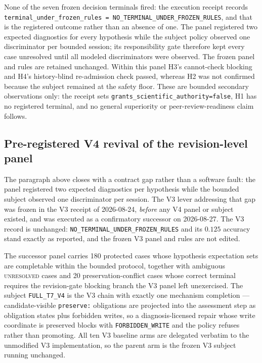 None of the seven frozen decision terminals fired: the execution receipt
records \texttt{terminal\_under\_frozen\_rules =
NO\_TERMINAL\_UNDER\_FROZEN\_RULES}, and that is the registered outcome rather
than an absence of one. The panel registered two
expected diagnostics for every hypothesis while the subject policy observed
one discriminator per bounded session; its responsibility gate therefore kept
every case unresolved until all modeled discriminators were observed. The
frozen panel and rules are retained unchanged. Within this panel H3's
cannot-check blocking and H4's history-blind re-admission check passed, whereas
H2 was not confirmed because the subject remained at the safety floor. These
are bounded secondary observations only: the receipt sets
\texttt{grants\_scientific\_authority=false}, H1 has no registered terminal,
and no general superiority or peer-review-readiness claim follows.

\subsection*{Pre-registered V4 revival of the revision-level panel}

The paragraph above closes with a contract gap rather than a software fault: the
panel registered two expected diagnostics per hypothesis while the bounded
subject observed one discriminator per session. The V3 lever addressing that gap
was frozen in the V3 receipt of 2026-08-24, \emph{before} any V4 panel or subject
existed, and was executed as a confirmatory successor on 2026-08-27. The V3
record is unchanged: \texttt{NO\_TERMINAL\_UNDER\_FROZEN\_RULES} and its $0.125$
accuracy stand exactly as reported, and the frozen V3 panel and rules are not
edited.

The successor panel carries 180 protected cases whose hypothesis expectation sets
are completable within the bounded protocol, together with ambiguous
\textsc{unresolved} cases and 20 preservation-conflict cases whose correct
terminal requires the revision-gate blocking branch the V3 panel left
unexercised. The subject \texttt{FULL\_T7\_V4} is the V3 chain with exactly one
mechanism completion --- candidate-visible \texttt{preserve:} obligations are
projected into the assessment step as obligation states plus forbidden writes, so
a diagnosis-licensed repair whose write coordinate is preserved blocks with
\texttt{FORBIDDEN\_WRITE} and the policy refuses rather than promoting. All ten
V3 baseline arms are delegated verbatim to the unmodified V3 implementation, so
the parent arm is the frozen V3 subject running unchanged.

